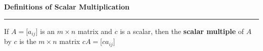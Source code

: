 \nopagenumbers
{\bf Definitions of Scalar Multiplication}
\vskip 1mm
\hrule

\vskip 6pt
If $A=\lbrack a_{ij}\rbrack$ is an $m\times n$ matrix and $c$ is a scalar, then the {\bf scalar multiple} of $A$ by $c$ is the $m\times n$ matrix $cA=\lbrack ca_{ij}\rbrack$


\vfill\eject
\bye
